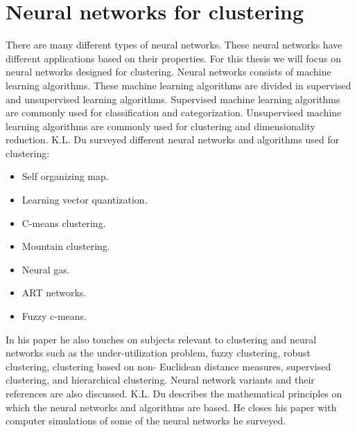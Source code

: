\documentclass[../main]{subfiles}
\begin{document}
\section{Neural networks for clustering}
\label{ch:neuralNetworkSurvey}
There are many different types of neural networks.
These neural networks have different applications based on their properties.
For this thesis we will focus on neural networks designed for clustering.
\newline
Neural networks consists of machine learning algorithms\cite{supervisedUnsupervised}. 
These machine learning algorithms are divided in supervised and unsupervised learning algorithms\cite{supervisedUnsupervised}.
Supervised machine learning algorithms are commonly used for classification and categorization\cite{supervisedUnsupervised}.
Unsupervised machine learning algorithms are commonly used for clustering and dimensionality reduction\cite{supervisedUnsupervised}.
\newline
K.L. Du surveyed different neural networks and algorithms used for clustering\cite{Du2010Clustering:Approach}:
\begin{itemize}
    \item Self organizing map.
    \item Learning vector quantization.
    \item C-means clustering.
    \item Mountain clustering.
    \item Neural gas.
    \item ART networks.
    \item Fuzzy c-means.
\end{itemize}
In his paper he also touches on subjects relevant to clustering and neural networks such as the under-utilization problem, fuzzy clustering, robust clustering, clustering based on non- Euclidean distance measures, supervised clustering, and hierarchical clustering.
Neural network variants and their references are also discussed.
\newline
K.L. Du describes the mathematical principles on which the neural networks and algorithms are based.
He closes his paper with computer simulations of some of the neural networks he surveyed.
\end{document}
